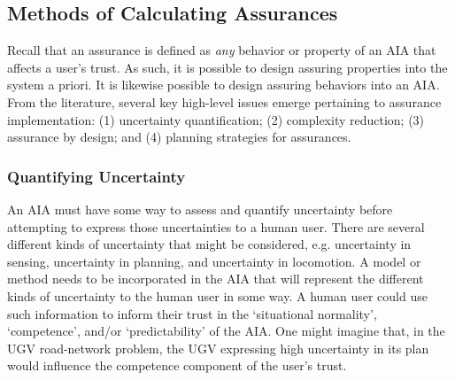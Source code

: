 \subsection{Methods of Calculating Assurances}\label{sec:methods}
Recall that an assurance is defined as \emph{any} behavior or property of an AIA that affects a user's trust. As such, it is possible to design assuring properties into the system a priori. It is likewise possible to design assuring behaviors into an AIA. From the literature, several key high-level issues emerge pertaining to assurance implementation: (1) uncertainty quantification; (2) complexity reduction; (3) assurance by design; and (4) planning strategies for assurances. 


\subsubsection{Quantifying Uncertainty} %
    An AIA must have some way to assess and quantify uncertainty before attempting to express those uncertainties to a human user.  There are several different kinds of uncertainty that might be considered, e.g. uncertainty in sensing, uncertainty in planning, and uncertainty in locomotion. A model or method needs to be incorporated in the AIA that will represent the different kinds of uncertainty to the human user in some way. A human user could use such information to inform their trust in the `situational normality', `competence', and/or `predictability' of the AIA. One might imagine that, in the UGV road-network problem, the UGV expressing high uncertainty in its plan would influence the competence component of the user's trust.%

